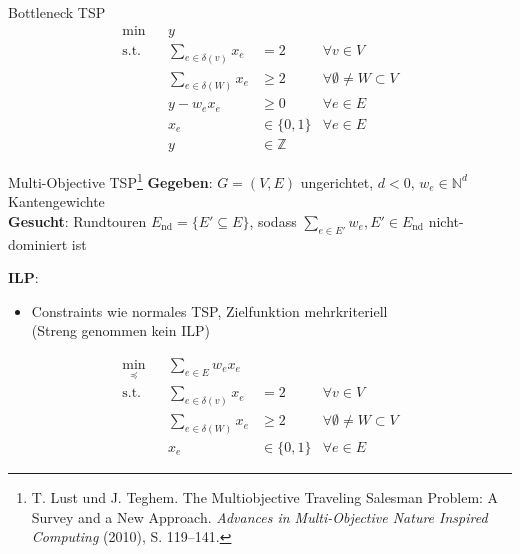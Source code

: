 \documentclass[ngerman,aspectratio=169,10pt]{beamer}
\begin{document}
\begin{frame}{Bottleneck TSP}
	\begin{align*}
	\min && y &&\\
	\text{s.t.} && \sum_{e\in \delta(v)}x_e &=2 &\forall v\in V\\
	&& \sum_{e\in \delta(W)}x_e &\geq2 &\forall \emptyset\neq W\subset V\\
	&& y - w_e x_e &\geq0 &\forall e \in E\\
	&& x_e &\in\{0,1\} &\forall e\in E\\
	&& y &\in\mathbb{Z} &
	\end{align*}
\end{frame}

\begin{frame}{Multi-Objective TSP\footnote{T. Lust und J. Teghem. The Multiobjective Traveling Salesman Problem: A Survey and a New Approach. \emph{Advances in Multi-Objective Nature Inspired Computing} (2010), S. 119–141.}}
	\textbf{Gegeben}: $G=(V,E)$ ungerichtet, $d<0$, $w_e\in{\mathbb{N}^d}$ Kantengewichte\\
	\textbf{Gesucht}: Rundtouren $E_\text{nd}=\{E'\subseteq E\}$, sodass $\sum_{e\in E'}w_e,E'\in E_\text{nd}$ nicht-dominiert ist

	\textbf{ILP}:
	\begin{itemize}
		\item Constraints wie normales TSP, Zielfunktion mehrkriteriell\\ (Streng genommen kein ILP)
	\end{itemize}
	\begin{align*}
		{\min}_\preceq && \sum_{e\in E}w_ex_e&&\\
		\text{s.t.} && \sum_{e\in \delta(v)}x_e &=2 &\forall v\in V\\
		&& \sum_{e\in \delta(W)}x_e &\geq2 &\forall \emptyset\neq W\subset V\\
		&& x_e &\in\{0,1\} &\forall e\in E
	\end{align*}

\end{frame}
\end{document}
